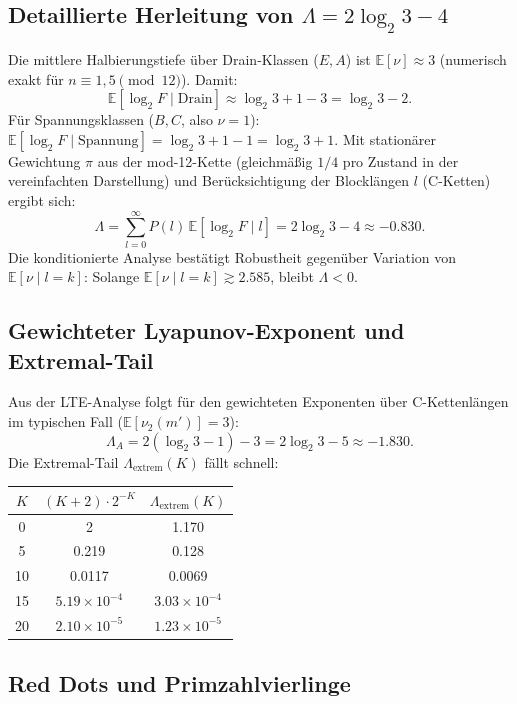 \documentclass[12pt,a4paper]{article}
\newcommand{\vii}{\nu_2}
\newcommand{\Lam}{\Lambda}
\begin{document}
\subsection{Detaillierte Herleitung von $\Lam = 2\log_2 3 - 4$}

Die mittlere Halbierungstiefe über Drain-Klassen ($E,A$) ist
$\mathbb{E}[\nu] \approx 3$ (numerisch exakt für $n \equiv 1,5 \pmod{12}$).
Damit:
\[
  \mathbb{E}[\log_2 F \mid \text{Drain}] \approx \log_2 3 + 1 - 3
  = \log_2 3 - 2.
\]
Für Spannungsklassen ($B,C$, also $\nu = 1$):
$\mathbb{E}[\log_2 F \mid \text{Spannung}] = \log_2 3 + 1 - 1 = \log_2 3 + 1$.
Mit stationärer Gewichtung $\pi$ aus der mod-12-Kette (gleichmäßig
$1/4$ pro Zustand in der vereinfachten Darstellung) und Berücksichtigung
der Blocklängen $l$ (C-Ketten) ergibt sich:
\[
  \Lam = \sum_{l=0}^{\infty} P(l)\,\mathbb{E}[\log_2 F \mid l]
  = 2\log_2 3 - 4 \approx -0.830.
\]
Die konditionierte Analyse bestätigt Robustheit gegenüber Variation von
$\mathbb{E}[\nu \mid l=k]$: Solange $\mathbb{E}[\nu \mid l=k] \gtrsim 2.585$,
bleibt $\Lam < 0$.

\subsection{Gewichteter Lyapunov-Exponent und Extremal-Tail}

Aus der LTE-Analyse folgt für den gewichteten Exponenten über C-Kettenlängen
im typischen Fall ($\mathbb{E}[\vii(m')] = 3$):
\[
  \Lambda_A = 2(\log_2 3 - 1) - 3 = 2\log_2 3 - 5 \approx -1.830.
\]
Die Extremal-Tail $\Lambda_{\mathrm{extrem}}(K)$ fällt schnell:

\begin{center}
\begin{tabular}{ccc}
\toprule
$K$ & $(K+2)\cdot 2^{-K}$ & $\Lambda_{\mathrm{extrem}}(K)$ \\
\midrule
0 & 2 & 1.170 \\
5 & 0.219 & 0.128 \\
10 & 0.0117 & 0.0069 \\
15 & $5.19\times 10^{-4}$ & $3.03\times 10^{-4}$ \\
20 & $2.10\times 10^{-5}$ & $1.23\times 10^{-5}$ \\
\bottomrule
\end{tabular}
\end{center}

\subsection{Red Dots und Primzahlvierlinge}
\end{document}
